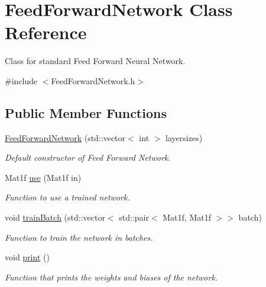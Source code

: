 \hypertarget{classFeedForwardNetwork}{}\section{Feed\+Forward\+Network Class Reference}
\label{classFeedForwardNetwork}


Class for standard Feed Forward Neural Network.  




{\ttfamily \#include $<$Feed\+Forward\+Network.\+h$>$}

\subsection*{Public Member Functions}
\begin{DoxyCompactItemize}
\item 
\hyperlink{classFeedForwardNetwork_a2f714c43ff596c5342aec449644a6709}{Feed\+Forward\+Network} (std\+::vector$<$ int $>$ layersizes)
\begin{DoxyCompactList}\small\item\em Default constructor of Feed Forward Network. \end{DoxyCompactList}\item 
Mat1f \hyperlink{classFeedForwardNetwork_a17eb3563391ca5aecdff73d538e33f91}{use} (Mat1f in)
\begin{DoxyCompactList}\small\item\em Function to use a trained network. \end{DoxyCompactList}\item 
void \hyperlink{classFeedForwardNetwork_a369f0c708a65b6eb7cf2b65d439fb5ce}{train\+Batch} (std\+::vector$<$ std\+::pair$<$ Mat1f, Mat1f $>$$>$ batch)
\begin{DoxyCompactList}\small\item\em Function to train the network in batches. \end{DoxyCompactList}\item 
\mbox{\label{classFeedForwardNetwork_a967b1a02a28fab0dfffec47489d64e21}} 
void \hyperlink{classFeedForwardNetwork_a967b1a02a28fab0dfffec47489d64e21}{print} ()
\begin{DoxyCompactList}\small\item\em Function that prints the weights and biases of the network. \end{DoxyCompactList}\end{DoxyCompactItemize}


